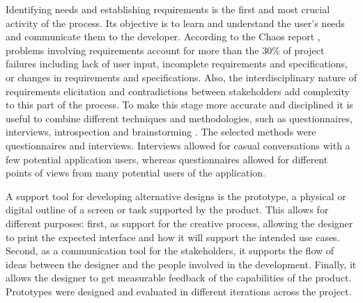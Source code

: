 Identifying needs and establishing requirements is the first and most crucial activity of the process. Its objective is to learn and understand the user's needs and communicate them to the developer. According to the Chaos report \cite{Group1994}, problems involving requirements account for more than the 30\% of project failures including lack of user input, incomplete requirements and specifications, or changes in requirements and specifications. Also, the interdisciplinary nature of requirements elicitation and contradictions between stakeholders add complexity to this part of the process. To make this stage more accurate and disciplined it is useful to combine different techniques and methodologies, such as questionnaires, interviews, introspection and brainstorming \cite{Coulin2005}. The selected methods were questionnaires and interviews. Interviews allowed for casual conversations with a few potential application users, whereas questionnaires allowed for different points of views from many potential users of the application. 

A support tool for developing alternative designs is the prototype, a physical or digital outline of a screen or task supported by the product. This allows for different purposes: first, as support for the creative process, allowing the designer to print the expected interface and how it will support the intended use cases. Second, as a communication tool for the stakeholders, it supports the flow of ideas between the designer and the people involved in the development. Finally, it allows the designer to get measurable feedback of the capabilities of the product. Prototypes were designed and evaluated in different iterations across the project.